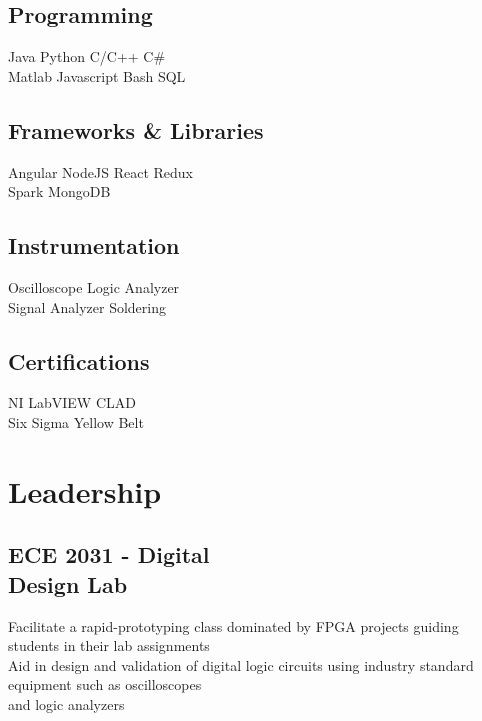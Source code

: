 \documentclass[]{deedy-resume-openfont}
\begin{document}
\begin{minipage}[t]{0.33\textwidth}
		\subsection{Programming}
		Java \textbullet{} Python \textbullet{} C/C++ \textbullet{} C\#\\
		Matlab \textbullet{} Javascript \textbullet{}Bash \textbullet{} SQL
		\sectionsep
		
		\subsection{Frameworks \& Libraries}
		Angular \textbullet{} NodeJS \textbullet{} React \textbullet{} Redux \textbullet{} \\
		Spark \textbullet{} MongoDB
		\sectionsep
		
		\subsection{Instrumentation}
		Oscilloscope \textbullet{}  Logic Analyzer \textbullet{} \\  Signal Analyzer \textbullet{} Soldering
		\sectionsep
		
		\subsection{Certifications}
		NI LabVIEW CLAD \textbullet{}\\ 
		Six Sigma Yellow Belt
		
		\section{Leadership}
		\subsection{ECE 2031 - Digital \\ Design Lab}
		\textbullet{} Facilitate a rapid-prototyping class dominated by FPGA projects guiding students in their lab assignments \\
		\textbullet{} Aid in design and validation of digital logic circuits using industry standard equipment such as oscilloscopes \\ and logic analyzers
		\sectionsep
		

\end{minipage}
\end{document}
